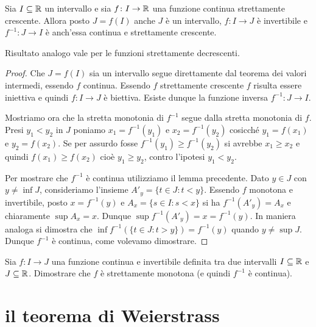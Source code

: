 \begin{theorem}
  \label{th:inversa_continua}
\mymark{*}
Sia $I\subseteq \mathbb R$ un intervallo e sia $f\colon I \to \mathbb R$ una
funzione continua strettamente crescente.
Allora posto $J=f(I)$ anche $J$ è un intervallo, $f\colon I\to J$ è
invertibile e $f^{-1}\colon J\to I$ è anch'essa
continua e strettamente crescente.

Risultato analogo vale per le funzioni strettamente decrescenti.
\end{theorem}
%
\begin{proof}
Che $J=f(I)$ sia un intervallo segue direttamente dal teorema dei valori intermedi, essendo $f$ continua. Essendo $f$ strettamente
crescente $f$ risulta essere iniettiva e quindi $f\colon I \to J$ è biettiva.
Esiste dunque la funzione inversa $f^{-1}\colon J \to I$.

Mostriamo ora che la stretta monotonia di $f^{-1}$ segue dalla stretta
monotonia di $f$. Presi $y_1 < y_2$ in $J$ poniamo $x_1=f^{-1}(y_1)$ e $x_2=f^{-1}(y_2)$ cosicché $y_1=f(x_1)$ e $y_2=f(x_2)$.
Se per assurdo fosse $f^{-1}(y_1)\ge f^{-1}(y_2)$ si avrebbe $x_1 \ge x_2$
e quindi $f(x_1)\ge f(x_2)$ cioè $y_1\ge y_2$, contro l'ipotesi $y_1 < y_2$.

Per mostrare che $f^{-1}$ è continua utilizziamo
il lemma precedente.
Dato $y \in J$ con $y\neq \inf J$, consideriamo l'insieme
$A'_y=\{t \in J\colon t<y\}$.
Essendo $f$ monotona e invertibile,
posto $x=f^{-1}(y)$ e $A_x=\{ s\in I\colon s<x\}$
si ha $f^{-1}(A'_y) = A_x$ e chiaramente $\sup A_x = x$.
Dunque $\sup f^{-1}(A'_y) = x = f^{-1}(y)$. In maniera analoga
si dimostra che $\inf f^{-1}(\{t\in J \colon t>y\}) = f^{-1}(y)$
quando $y\neq \sup J$. Dunque $f^{-1}$ è continua,
come volevamo dimostrare.
\end{proof}

\begin{exercise}\label{ex:inversa_monotona}
Sia $f\colon I\to J$ una funzione continua e invertibile definita tra due
intervalli $I\subseteq \mathbb R$ e $J\subseteq \mathbb R$. Dimostrare che $f$ è strettamente
monotona (e quindi $f^{-1}$ è continua).
\end{exercise}

\section{il teorema di Weierstrass}

